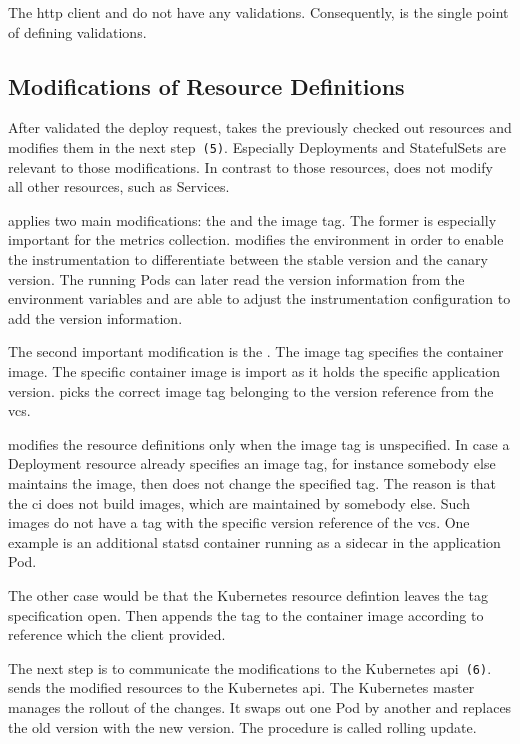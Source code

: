 The \gls{http} client and \depctl{} do not have any validations. Consequently, \deployer{} is the
single point of defining validations.

\subsection{Modifications of Resource Definitions}

After \deployer{} validated the deploy request, \deployer{} takes the previously checked out
resources and modifies them in the next step~\texttt{(5)}. Especially Deployments and
StatefulSets are relevant to those modifications. In contrast to those resources, \deployer{}
does not modify all other resources, such as Services.

\deployer{} applies two main modifications: the  and the image tag. The
former is especially important for the metrics collection. \deployer{} modifies the
environment in order to enable the instrumentation to differentiate between the stable
version and the canary version. The running Pods can later read the version information
from the environment variables and are able to adjust the instrumentation configuration to
add the version information.

The second important modification is the . The image tag specifies the
container image. The specific container image is import as it holds the specific
application version. \deployer{} picks the correct image tag belonging to the version
reference from the \gls{vcs}.

\deployer{} modifies the resource definitions only when the image tag is unspecified. In
case a Deployment resource already specifies an image tag, for instance somebody else
maintains the image, then \deployer{} does not change the specified tag. The reason is that
the \gls{ci} does not build images, which are maintained by somebody else. Such images do
not have a tag with the specific version reference of the \gls{vcs}. One example is an
additional statsd container running as a sidecar in the application Pod.

The other case would be that the Kubernetes resource defintion leaves the tag
specification open. Then \deployer{} appends the tag to the container image according to
reference which the client provided.

The next step is to communicate the modifications to the Kubernetes
\gls{api}~\texttt{(6)}. \deployer{} sends the modified resources to the Kubernetes \gls{api}. The
Kubernetes master manages the rollout of the changes. It swaps out one Pod by another and
replaces the old version with the new version. The procedure is called rolling update.

